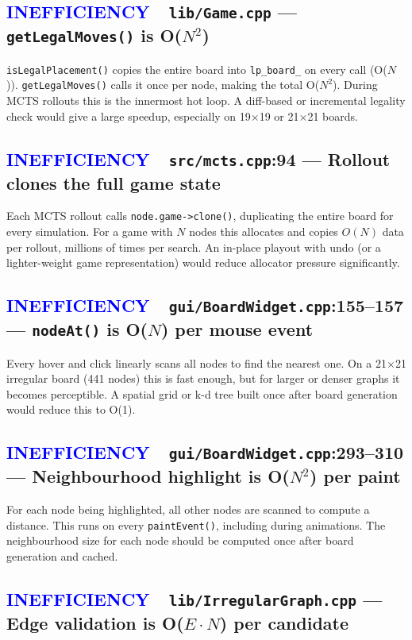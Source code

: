 \documentclass[11pt,letterpaper]{article}
\newcommand{\file}[1]{\texttt{#1}}
\newcommand{\code}[1]{\texttt{#1}}
\newcommand{\ineff}{\textcolor{blue}{\textbf{INEFFICIENCY}}}
\begin{document}
\subsection{\ineff\ \ \file{lib/Game.cpp} — \code{getLegalMoves()} is O($N^2$)}

\code{isLegalPlacement()} copies the entire board into \code{lp\_board\_}
on every call (O($N$)).  \code{getLegalMoves()} calls it once per node, making
the total O($N^2$).  During MCTS rollouts this is the innermost hot loop.
A diff-based or incremental legality check would give a large speedup,
especially on 19$\times$19 or 21$\times$21 boards.

\subsection{\ineff\ \ \file{src/mcts.cpp}:94 — Rollout clones the full game state}

Each MCTS rollout calls \code{node.game->clone()}, duplicating the entire
board for every simulation.  For a game with $N$ nodes this allocates
and copies $O(N)$ data per rollout, millions of times per search.  An
in-place playout with undo (or a lighter-weight game representation) would
reduce allocator pressure significantly.

\subsection{\ineff\ \ \file{gui/BoardWidget.cpp}:155--157 — \code{nodeAt()} is O($N$) per mouse event}

Every hover and click linearly scans all nodes to find the nearest one.
On a 21$\times$21 irregular board (441 nodes) this is fast enough, but
for larger or denser graphs it becomes perceptible.  A spatial grid or
k-d tree built once after board generation would reduce this to O(1).

\subsection{\ineff\ \ \file{gui/BoardWidget.cpp}:293--310 — Neighbourhood highlight is O($N^2$) per paint}

For each node being highlighted, all other nodes are scanned to compute
a distance.  This runs on every \code{paintEvent()}, including during
animations.  The neighbourhood size for each node should be computed once
after board generation and cached.

\subsection{\ineff\ \ \file{lib/IrregularGraph.cpp} — Edge validation is O($E \cdot N$) per candidate}
\end{document}
